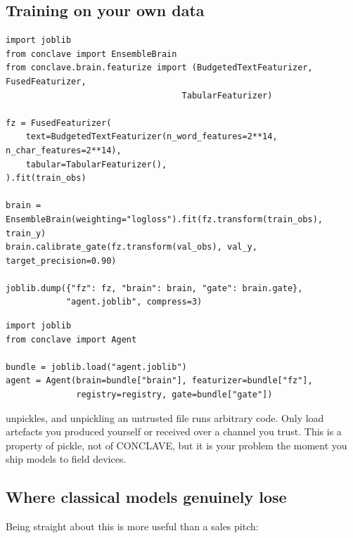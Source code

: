 \subsection{Training on your own data}

\begin{codebox}
\begin{lstlisting}[style=py]
import joblib
from conclave import EnsembleBrain
from conclave.brain.featurize import (BudgetedTextFeaturizer, FusedFeaturizer,
                                   TabularFeaturizer)

fz = FusedFeaturizer(
    text=BudgetedTextFeaturizer(n_word_features=2**14, n_char_features=2**14),
    tabular=TabularFeaturizer(),
).fit(train_obs)

brain = EnsembleBrain(weighting="logloss").fit(fz.transform(train_obs), train_y)
brain.calibrate_gate(fz.transform(val_obs), val_y, target_precision=0.90)

joblib.dump({"fz": fz, "brain": brain, "gate": brain.gate},
            "agent.joblib", compress=3)
\end{lstlisting}
\end{codebox}

\begin{codebox}
\begin{lstlisting}[style=py]
import joblib
from conclave import Agent

bundle = joblib.load("agent.joblib")
agent = Agent(brain=bundle["brain"], featurizer=bundle["fz"],
              registry=registry, gate=bundle["gate"])
\end{lstlisting}
\end{codebox}

\begin{dangerbox}
 unpickles, and unpickling an untrusted file runs arbitrary
code. Only load artefacts you produced yourself or received over a channel you
trust. This is a property of pickle, not of CONCLAVE, but it is your problem the
moment you ship models to field devices.
\end{dangerbox}

\subsection{Where classical models genuinely lose}

Being straight about this is more useful than a sales pitch:

